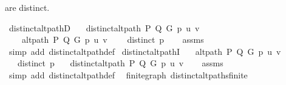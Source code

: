 \begin{isabellebody}
\begin{isamarkuptext}
are distinct.%
\end{isamarkuptext}\isamarkuptrue%
%
\isadeliminvisible
%
\endisadeliminvisible
%
\isataginvisible
{}\isamarkupfalse%
\ distinct{\isacharunderscore}{\kern0pt}alt{\isacharunderscore}{\kern0pt}pathD{\isacharcolon}{\kern0pt}\isanewline
\ \ \ {\isachardoublequoteopen}distinct{\isacharunderscore}{\kern0pt}alt{\isacharunderscore}{\kern0pt}path\ P\ Q\ G\ p\ u\ v{\isachardoublequoteclose}\isanewline
\ \ \isanewline
\ \ \ \ {\isachardoublequoteopen}alt{\isacharunderscore}{\kern0pt}path\ P\ Q\ G\ p\ u\ v{\isachardoublequoteclose}\isanewline
\ \ \ \ {\isachardoublequoteopen}distinct\ p{\isachardoublequoteclose}%
\endisataginvisible
{\isafoldinvisible}%
%
\isadeliminvisible
%
\endisadeliminvisible
\isanewline
%
\isadelimproof
\ \ %
\endisadelimproof
%
\isatagproof
{}\isamarkupfalse%
\ assms\isanewline
\ \ \isamarkupfalse%
\ {\isacharparenleft}{\kern0pt}simp\ add{\isacharcolon}{\kern0pt}\ distinct{\isacharunderscore}{\kern0pt}alt{\isacharunderscore}{\kern0pt}path{\isacharunderscore}{\kern0pt}def{\isacharparenright}{\kern0pt}{\isacharplus}{\kern0pt}%
\endisatagproof
{\isafoldproof}%
%
\isadelimproof
%
\endisadelimproof
\isanewline
%
\isadeliminvisible
\isanewline
%
\endisadeliminvisible
%
\isataginvisible
{}\isamarkupfalse%
\ distinct{\isacharunderscore}{\kern0pt}alt{\isacharunderscore}{\kern0pt}pathI{\isacharcolon}{\kern0pt}\isanewline
\ \ \ {\isachardoublequoteopen}alt{\isacharunderscore}{\kern0pt}path\ P\ Q\ G\ p\ u\ v{\isachardoublequoteclose}\isanewline
\ \ \ {\isachardoublequoteopen}distinct\ p{\isachardoublequoteclose}\isanewline
\ \ \ {\isachardoublequoteopen}distinct{\isacharunderscore}{\kern0pt}alt{\isacharunderscore}{\kern0pt}path\ P\ Q\ G\ p\ u\ v{\isachardoublequoteclose}%
\endisataginvisible
{\isafoldinvisible}%
%
\isadeliminvisible
%
\endisadeliminvisible
\isanewline
%
\isadelimproof
\ \ %
\endisadelimproof
%
\isatagproof
{}\isamarkupfalse%
\ assms\isanewline
\ \ \isamarkupfalse%
\ {\isacharparenleft}{\kern0pt}simp\ add{\isacharcolon}{\kern0pt}\ distinct{\isacharunderscore}{\kern0pt}alt{\isacharunderscore}{\kern0pt}path{\isacharunderscore}{\kern0pt}def{\isacharparenright}{\kern0pt}%
\endisatagproof
{\isafoldproof}%
%
\isadelimproof
%
\endisadelimproof
\isanewline
\isanewline
{}\isamarkupfalse%
\ {\isacharparenleft}{\kern0pt}\ finite{\isacharunderscore}{\kern0pt}graph{\isacharparenright}{\kern0pt}\ distinct{\isacharunderscore}{\kern0pt}alt{\isacharunderscore}{\kern0pt}paths{\isacharunderscore}{\kern0pt}finite{\isacharcolon}{\kern0pt}\isanewline

\end{isabellebody}
